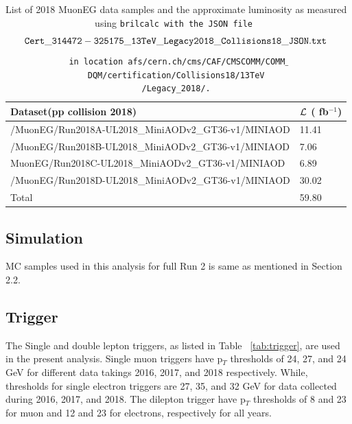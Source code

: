 \documentclass{cernatlasnote}
\newcommand{\fbinv}{\! fb$^{-1}$\xspace}
\begin{document}
\begin{table}[htbp]\label{tab:datasets2018}
\begin{center}
\begin{tabular}{|l|l|}
\hline
Dataset(pp collision 2018) & $\cal L$ (\fbinv) \\\hline
 /MuonEG/Run2018A-UL2018\_MiniAODv2\_GT36-v1/MINIAOD      &  11.41 \\
 /MuonEG/Run2018B-UL2018\_MiniAODv2\_GT36-v1/MINIAOD    & 7.06 \\
  MuonEG/Run2018C-UL2018\_MiniAODv2\_GT36-v1/MINIAOD     & 6.89  \\
  /MuonEG/Run2018D-UL2018\_MiniAODv2\_GT36-v1/MINIAOD     & 30.02 \\ \hline
Total  & 59.80 \\ \hline
\end{tabular}
\end{center}
\caption{List of 2018 MuonEG data samples and the approximate luminosity as measured using \tt brilcalc with the JSON file $${\tt Cert\_314472-325175\_13TeV\_Legacy2018\_Collisions18\_JSON.txt}$$ in location afs/cern.ch/cms/CAF/CMSCOMM/COMM$\_$DQM/certification/Collisions18/13TeV \\/Legacy\_2018/.}\label{tab:datasets2018}
\end{table}
\subsection{Simulation}\label{sec:samples}
 MC samples used in this analysis for full Run 2 is same as mentioned in Section 2.2. 


\subsection{Trigger}
The Single and double lepton triggers, as listed in Table ~\ref{tab:trigger}, are used in the present analysis. Single muon triggers have p$_{T}$ thresholds of 24, 27, and 24 GeV for different data takings 2016, 2017, and 2018 respectively. While, thresholds for single electron triggers are 27, 35, and 32 GeV for data collected during 2016, 2017, and 2018. 
The dilepton trigger have p$_{T}$ thresholds of 8 and 23 for muon and 12 and 23 for electrons, respectively for all years.
\end{document}
